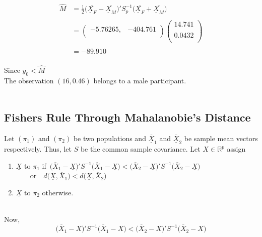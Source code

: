 \documentclass[11pt,a4paper]{article}
\theoremstyle{definition}
\begin{document}
\begin{align*}
\widehat{M} & = \frac{1}{2}\big(\overline{\underline{X}_F}-\overline{\underline{X}_M}\big)'S^{-1}_p\big(\overline{\underline{X}_F}+\overline{\underline{X}_M}\big)\\\\
& = \begin{pmatrix}
-5.76265, & -404.761\\
\end{pmatrix}
\begin{pmatrix}
14.741\\
\\
0.0432\\
\end{pmatrix}\\\\
& = -89.910\\
\end{align*}

Since $y_0 < \widehat{M}$\\
The observation $(16,0.46)$ belongs to a male participant.\\\\




\subsection{Fishers Rule Through Mahalanobie's Distance}
Let $(\pi_1)$ and $(\pi_2)$ be two populations and $\overline{\underline{X}}_1$ and $\overline{\underline{X}}_2$ be sample mean vectors respectively. Thus, let $S$ be the common sample covariance. Let $X\in \mathbb{R}^p$ assign
\begin{enumerate}
\item $\underline{X}$ to $\pi_1$ if\,
$\displaystyle{\big(\overline{X}_1 -\underline{X}\big)'S^{-1}\big(\overline{X}_1-\underline{X}\big) < \big(\overline{X}_2-\underline{X}\big)'S^{-1}\big(\overline{X}_2-\underline{X}\big)}$
$\qquad\text{or}\quad  d\big(\underline{X},\overline{X}_1\big) < d\big(\underline{X},\overline{X}_2\big)$

\item $\underline{X}$ to $\pi_2$ otherwise.\\\\
\end{enumerate}



Now,
$$\big(\overline{X}_1 - X\big)'S^{-1}\big(\overline{X}_1- X\big) < \big(\overline{X}_2-X\big)'S^{-1}\big(\overline{X}_2 - X\big)$$
\end{document}
